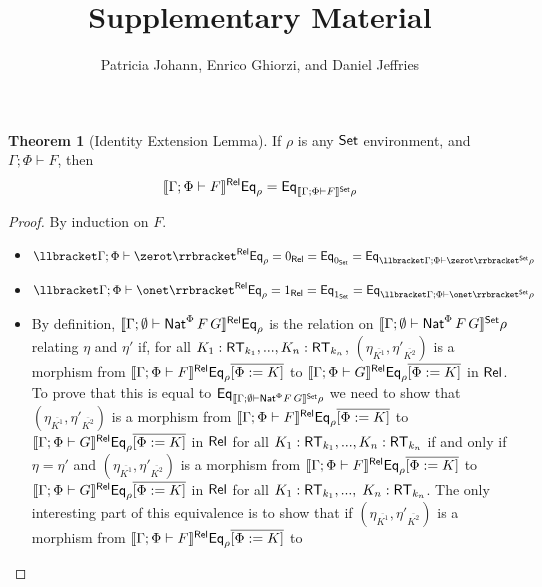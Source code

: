 \documentclass[acmsmall,review,anonymous]{acmart}
\title[Supplementary Material]{Supplementary Material} %
\author{Patricia Johann, Enrico Ghiorzi, and Daniel Jeffries}
\affiliation{
  \institution{Appalachian State University}            %
}
\theoremstyle{definition}
\newtheorem*{nono-theorem}{Theorem}
\begin{document}
\maketitle

\begin{nono-theorem}[Identity Extension Lemma]\label{thm:iel}
If $\rho$ is any ${\mathsf{Set}}$ environment, and $\Gamma; \Phi \vdash F$, then
\[\llbracket{\Gamma; \Phi \vdash F}\rrbracket^{\mathsf{Rel}} \mathsf{Eq}_\rho = \mathsf{Eq}_{\llbracket{\Gamma; \Phi
    \vdash F}\rrbracket^{\mathsf{Set}}\rho}\]
\end{nono-theorem}
\begin{proof}
By induction on $F$.
\begin{itemize}
\item $\oCPORsem{\Gamma; \Phi \vdash \zerot} \Eq_{\rho} = 0_\oCPOR =
  \Eq_{0_\oCPO} = \Eq_{\oCPOsem{\Gamma; \Phi \vdash \zerot}\rho}$
\item $\oCPORsem{\Gamma; \Phi \vdash \onet} \Eq_{\rho} = 1_\oCPOR =
  \Eq_{1_\oCPO} = \Eq_{\oCPOsem{\Gamma; \Phi \vdash \onet}\rho}$
\item
By definition, $\llbracket{\Gamma; \emptyset \vdash \mathsf{Nat}^\Phi \,F\,G}\rrbracket^{\mathsf{Rel}}
\mathsf{Eq}_{\rho}$ is the relation on $\llbracket{\Gamma; \emptyset \vdash
  \mathsf{Nat}^\Phi \,F\,G}\rrbracket^{\mathsf{Set}} \rho$ relating $\eta$ and $\eta'$ if, for all $K_1
: {\mathsf{RT}}_{k_1},...,K_n : {\mathsf{RT}}_{k_n}$, $(\eta_{\overline{K^1}},
\eta'_{\overline{K^2}})$ is a morphism from $\llbracket{\Gamma; \Phi
  \vdash F}\rrbracket^{\mathsf{Rel}} \mathsf{Eq}_{\rho}\overline{[\Phi := K]}$ to $\llbracket{\Gamma ;
  \Phi \vdash G}\rrbracket^{\mathsf{Rel}} \mathsf{Eq}_{\rho}\overline{[\Phi := K]}$ in ${\mathsf{Rel}}$.  To
prove that this is equal to $\mathsf{Eq}_{\llbracket{\Gamma; \emptyset \vdash
    \mathsf{Nat}^\Phi F\,G}\rrbracket^{\mathsf{Set}} \rho}$ we need to show that
$(\eta_{\overline{K^1}}, \eta'_{\overline{K^2}})$ is a morphism from
$\llbracket{\Gamma; \Phi \vdash F}\rrbracket^{\mathsf{Rel}} \mathsf{Eq}_{\rho}\overline{[\Phi := K]}$ to
$\llbracket{\Gamma ; \Phi \vdash G}\rrbracket^{\mathsf{Rel}} \mathsf{Eq}_{\rho}\overline{[\Phi := K]}$
in ${\mathsf{Rel}}$ for all $K_1 : {\mathsf{RT}}_{k_1},...,K_n : {\mathsf{RT}}_{k_n}$ if
and only if $\eta = \eta'$ and $(\eta_{\overline{K^1}},
\eta'_{\overline{K^2}})$ is a morphism from $\llbracket{\Gamma; \Phi
  \vdash F}\rrbracket^{\mathsf{Rel}} \mathsf{Eq}_{\rho}\overline{[\Phi := K]}$ to $\llbracket{\Gamma ;
  \Phi \vdash G}\rrbracket^{\mathsf{Rel}} \mathsf{Eq}_{\rho}\overline{[\Phi := K]}$ in ${\mathsf{Rel}}$ for all
$K_1 : {\mathsf{RT}}_{k_1},...,$ $ K_n : {\mathsf{RT}}_{k_n}$.  The only
interesting part of this equivalence is to show that if
$(\eta_{\overline{K^1}}, \eta'_{\overline{K^2}})$ is a morphism from
$\llbracket{\Gamma; \Phi \vdash F}\rrbracket^{\mathsf{Rel}} \mathsf{Eq}_{\rho}\overline{[\Phi := K]}$ to

\end{itemize}
\end{proof}
\end{document}
